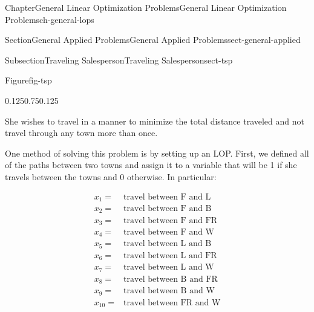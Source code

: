 \documentclass[oneside,10pt,]{book}
\numberwithin{equation}{section}
\newcommand{\amp}{&}
\begin{document}
\begin{chapterptx}{Chapter}{General Linear Optimization Problems}{}{General Linear Optimization Problems}{}{}{ch-general-lops}
\begin{sectionptx}{Section}{General Applied Problems}{}{General Applied Problems}{}{}{sect-general-applied}
\begin{subsectionptx}{Subsection}{Traveling Salesperson}{}{Traveling Salesperson}{}{}{sect-tsp}
\begin{figureptx}{Figure}{}{fig-tsp}{}%
\begin{image}{0.125}{0.75}{0.125}{}%
%
\end{image}%
\tcblower
\end{figureptx}%
She wishes to travel in a manner to minimize the total distance traveled and not travel through any town more than once.%
\par
One method of solving this problem is by setting up an LOP. First, we defined all of the paths between two towns and assign it to a variable that will be 1 if she travels between the towns and 0 otherwise. In particular:%
\par
%
\begin{equation*}
\begin{aligned} x_1 = \amp \text{travel between F and L} \\ x_2 = \amp \text{travel between F and B} \\ x_3 = \amp \text{travel between F and FR} \\ x_4 = \amp \text{travel between F and W} \\ x_5 = \amp \text{travel between L and B} \\ x_6 = \amp \text{travel between L and FR} \\ x_7 = \amp \text{travel between L and W} \\ x_8 = \amp \text{travel between B and FR} \\ x_9 = \amp \text{travel between B and W} \\ x_{10} = \amp \text{travel between FR and W} \\ \end{aligned}

\end{equation*}
\end{subsectionptx}
\end{sectionptx}
\end{chapterptx}
\end{document}
